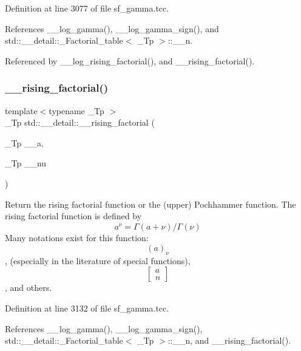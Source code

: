 Definition at line 3077 of file sf\+\_\+gamma.\+tcc.



References \+\_\+\+\_\+log\+\_\+gamma(), \+\_\+\+\_\+log\+\_\+gamma\+\_\+sign(), and std\+::\+\_\+\+\_\+detail\+::\+\_\+\+Factorial\+\_\+table$<$ \+\_\+\+Tp $>$\+::\+\_\+\+\_\+n.



Referenced by \+\_\+\+\_\+log\+\_\+rising\+\_\+factorial(), and \+\_\+\+\_\+rising\+\_\+factorial().

\mbox{\label{namespacestd_1_1____detail_a109a13aa776d60bdc49b1cedc0e77670}} 
\subsubsection{\texorpdfstring{\+\_\+\+\_\+rising\+\_\+factorial()}{\_\_rising\_factorial()}\hspace{0.1cm}{\footnotesize\ttfamily [2/2]}}
{\footnotesize\ttfamily template$<$typename \+\_\+\+Tp $>$ \\
\+\_\+\+Tp std\+::\+\_\+\+\_\+detail\+::\+\_\+\+\_\+rising\+\_\+factorial (\begin{DoxyParamCaption}\item[{\+\_\+\+Tp}]{\+\_\+\+\_\+a,  }\item[{\+\_\+\+Tp}]{\+\_\+\+\_\+nu }\end{DoxyParamCaption})}



Return the rising factorial function or the (upper) Pochhammer function. The rising factorial function is defined by \[ a^{\overline{\nu}} = \Gamma(a + \nu) / \Gamma(\nu) \] Many notations exist for this function\+: \[ (a)_\nu \], (especially in the literature of special functions), \[ \left[ \begin{array}{c} a \\ n \end{array} \right] \], and others. 



Definition at line 3132 of file sf\+\_\+gamma.\+tcc.



References \+\_\+\+\_\+log\+\_\+gamma(), \+\_\+\+\_\+log\+\_\+gamma\+\_\+sign(), std\+::\+\_\+\+\_\+detail\+::\+\_\+\+Factorial\+\_\+table$<$ \+\_\+\+Tp $>$\+::\+\_\+\+\_\+n, and \+\_\+\+\_\+rising\+\_\+factorial().


